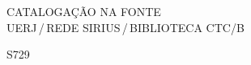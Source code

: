 %
% 


\begin{titlepage}
	\begin{center}
\vfill
\singlespacing
	\vspace*{65mm}
	{CATALOGAÇÃO NA FONTE\\ \vspace{1.5mm}
	UERJ\,/\,REDE SIRIUS\,/\,BIBLIOTECA CTC/B}\\
	\vspace{1.5mm}
	\begin{boxedminipage}{140mm}
	\begin{minipage}{5mm}
		\vspace{-84mm}
		S729
	\end{minipage}
	\hfill
	\raisebox{8.5mm}{
	\begin{minipage}[top]{115mm}
		\vspace*{5mm}


\end{minipage}}
\end{boxedminipage}
\end{center}
\end{titlepage}
